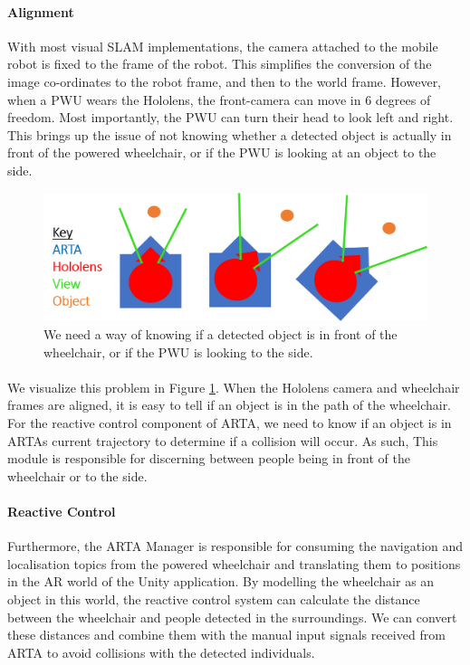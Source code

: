 \paragraph{Alignment}With most visual SLAM implementations, the camera attached to the mobile robot is fixed to the frame of the robot. This simplifies the conversion of the image co-ordinates to the robot frame, and then to the world frame. However, when a PWU wears the Hololens, the front-camera can move in 6 degrees of freedom. Most importantly, the PWU can turn their head to look left and right. This brings up the issue of not knowing whether a detected object is actually in front of the powered wheelchair, or if the PWU is looking at an object to the side. 

\begin{figure}[ht!]
    \centering
    \includegraphics[width=0.9\linewidth]{img/chapter4_analysis/holoArtaAligned.png}
    \caption{We need a way of knowing if a detected object is in front of the wheelchair, or if the PWU is looking to the side. }
    \label{fig:holoArtaAlignment}
\end{figure}

\paragraph{}We visualize this problem in Figure \ref{fig:holoArtaAlignment}. When the Hololens camera and wheelchair frames are aligned, it is easy to tell if an object is in the path of the wheelchair. For the reactive control component of ARTA, we need to know if an object is in ARTAs current trajectory to determine if a collision will occur. As such, This module is responsible for discerning between people being in front of the wheelchair or to the side. 

\paragraph{Reactive Control} Furthermore, the ARTA Manager is responsible for consuming the navigation and localisation topics from the powered wheelchair and translating them to positions in the AR world of the Unity application. By modelling the wheelchair as an object in this world, the reactive control system can calculate the distance between the wheelchair and people detected in the surroundings. We can convert these distances and combine them with the manual input signals received from ARTA to avoid collisions with the detected individuals.

